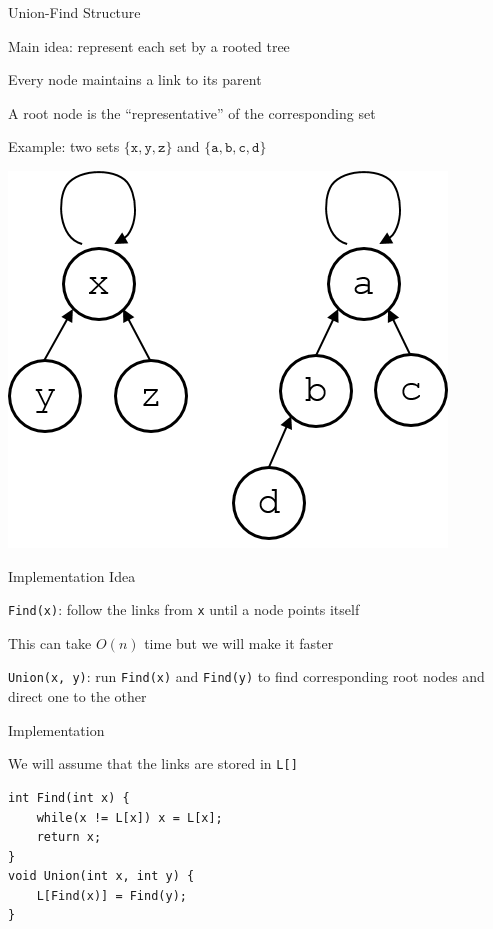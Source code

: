 \documentclass[13pt,onlymath]{beamer}
\begin{document}
\begin{frame}[fragile]{Union-Find Structure}
\BIT
\item Main idea: represent each set by a rooted tree
\BIT
\item Every node maintains a link to its parent
\item A root node is the ``representative'' of the corresponding set
\item Example: two sets $\{\mathtt{x}, \mathtt{y}, \mathtt{z}\}$ and $\{\mathtt{a}, \mathtt{b}, \mathtt{c}, \mathtt{d}\}$\EIT
\EIT
\begin{center}
\includegraphics[height=0.4\textheight]{figures/disjoint_set.png}
\end{center}
\end{frame}

\begin{frame}[fragile]{Implementation Idea}
\BIT
\item \verb.Find(x).: follow the links from \verb,x, until a node points itself
\BIT
\item This can take $O(n)$ time but we will make it faster
\EIT
\vfill
\item \verb.Union(x, y).: run \verb,Find(x), and \verb,Find(y), to find corresponding root nodes and direct one to the other
\EIT
\end{frame}

\begin{frame}[fragile]{Implementation}
\BIT
\item We will assume that the links are stored in \verb.L[].
\EIT
\vfill
\begin{Verbatim}[xleftmargin=25pt]
int Find(int x) {
    while(x != L[x]) x = L[x];
    return x;
}
void Union(int x, int y) {
    L[Find(x)] = Find(y);
}
\end{Verbatim}
\end{frame}
\end{document}
